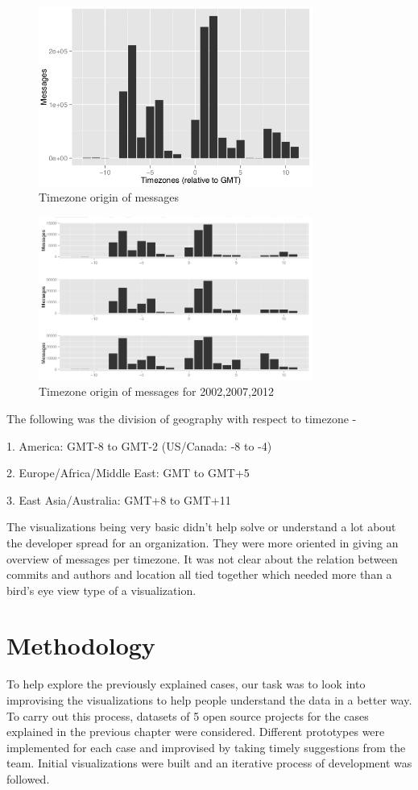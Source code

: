 \documentclass[seploa]{beavtex}
\begin{document}
\begin{figure}[!ht]
\centering
\includegraphics[width=90mm]{work1.png}
\caption{Timezone origin of messages}
\end{figure}

\begin{figure}[!ht]
\centering
\includegraphics[width=90mm]{work2.png}
\caption{Timezone origin of messages for 2002,2007,2012}
\end{figure}

The following was the division of geography with respect to timezone -

1. America: GMT-8 to GMT-2 (US/Canada: -8 to -4)

2. Europe/Africa/Middle East: GMT to GMT+5

3. East Asia/Australia: GMT+8 to GMT+11


The visualizations being very basic didn't help solve or understand a lot about the developer spread for an organization. They were more oriented in giving an overview of messages per timezone. It was not clear about the relation between commits and authors and location all tied together which needed more than a bird's eye view type of a visualization. 


\chapter{Methodology}
To help explore the previously explained cases, our task was to look into improvising the visualizations to help people understand the data in a better way. To carry out this process, datasets of 5 open source projects for the cases explained in the previous chapter were considered. Different prototypes were implemented for each case and improvised by taking timely suggestions from the team. Initial visualizations were built and an iterative process of development was followed.
\end{document}
